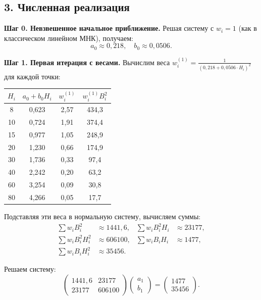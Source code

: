 \documentclass{article}
\begin{document}
\subsection*{3. Численная реализация}

\textbf{Шаг 0. Невзвешенное начальное приближение.}
Решая систему с $w_i = 1$ (как в классическом линейном МНК), получаем:
\begin{equation}
a_0 \approx 0{,}218, \quad b_0 \approx 0{,}0506.
\end{equation}

\textbf{Шаг 1. Первая итерация с весами.}
Вычислим веса $w_i^{(1)} = \frac{1}{(0{,}218 + 0{,}0506 \cdot H_i)^2}$ для каждой точки:
\begin{center}
\begin{tabular}{|c|c|c|c|}
\hline
$H_i$ & $a_0 + b_0 H_i$ & $w_i^{(1)}$ & $w_i^{(1)} B_i^2$ \\
\hline
8 & 0,623 & 2,57 & 434,3 \\
10 & 0,724 & 1,91 & 374,4 \\
15 & 0,977 & 1,05 & 248,9 \\
20 & 1,230 & 0,66 & 174,9 \\
30 & 1,736 & 0,33 & 97,4 \\
40 & 2,242 & 0,20 & 63,2 \\
60 & 3,254 & 0,09 & 30,8 \\
80 & 4,266 & 0,05 & 17,7 \\
\hline
\end{tabular}
\end{center}

Подставляя эти веса в нормальную систему, вычисляем суммы:
\begin{align*}
\sum w_i B_i^2 &\approx 1441,6, & \sum w_i B_i^2 H_i &\approx 23177, \\
\sum w_i B_i^2 H_i^2 &\approx 606100, & \sum w_i B_i H_i &\approx 1477, \\
\sum w_i B_i H_i^2 &\approx 35456. & &
\end{align*}

Решаем систему:
\begin{equation}
\begin{pmatrix}
1441{,}6 & 23177 \\
23177 & 606100
\end{pmatrix}
\begin{pmatrix}
a_1 \\ b_1
\end{pmatrix}
=
\begin{pmatrix}
1477 \\ 35456
\end{pmatrix}.
\end{equation}
\end{document}
